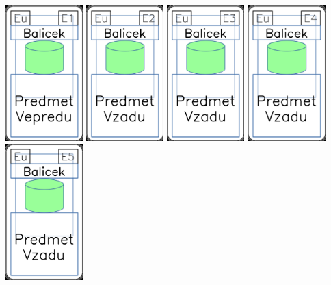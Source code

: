 \documentclass[a4paper]{article}
\begin{document}
	\includegraphics[width=3.0cm]{img-4_20}
	\includegraphics[width=3.0cm]{img-4_21}
	\includegraphics[width=3.0cm]{img-4_22}
	\includegraphics[width=3.0cm]{img-4_23}
	\includegraphics[width=3.0cm]{img-4_24}
\end{document}
